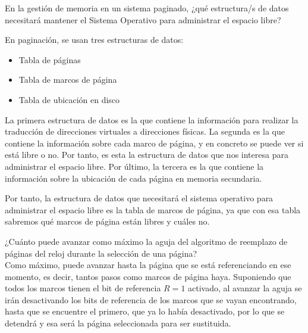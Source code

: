 \begin{ejercicio}
    En la gestión de memoria en un sistema paginado, ¿qué estructura/s de datos necesitará
mantener el Sistema Operativo para administrar el espacio libre?

    En paginación, se usan tres estructuras de datos:
    \begin{itemize}
        \item {Tabla de páginas}
        \item {Tabla de marcos de página}
        \item {Tabla de ubicación en disco}
    \end{itemize}

    La primera estructura de datos es la que contiene la información para realizar la traducción de direcciones virtuales a direcciones físicas.
    La segunda es la que contiene la información sobre cada marco de página, y en concreto se puede ver si está libre o no. Por tanto, es esta la estructura de datos
    que nos interesa para administrar el espacio libre.
    Por último, la tercera es la que contiene la información sobre la ubicación de cada página en memoria secundaria.

    Por tanto, la estructura de datos que necesitará el sistema operativo para administrar el espacio libre es la tabla de marcos de página, ya que con esa tabla sabremos
    qué marcos de página están libres y cuáles no.
\end{ejercicio}


\begin{ejercicio}
    ¿Cuánto puede avanzar como máximo la aguja del algoritmo de reemplazo de páginas
del reloj durante la selección de una página?\\

    Como máximo, puede avanzar hasta la página que se está referenciando en ese momento, es decir,
    tantos pasos como marcos de página haya. Suponiendo que todos los marcos tienen el bit de referencia
    $R=1$ activado, al avanzar la aguja se irán desactivando los bits de referencia de los marcos que se
    vayan encontrando, hasta que se encuentre el primero, que ya lo había desactivado, por lo que se
    detendrá y esa será la página seleccionada para ser sustituida.
\end{ejercicio}



